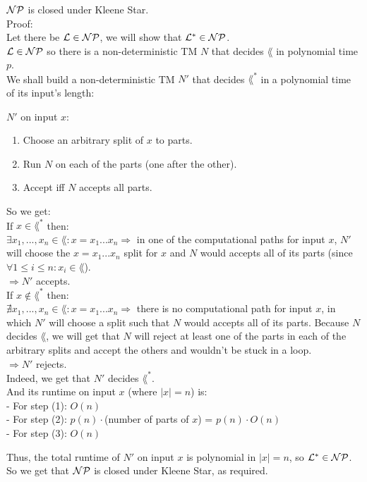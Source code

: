 $\mathcal{N}\mathcal{P}$ is closed under Kleene Star. \\

Proof: \\
Let there be $\mathcal{L} \in \mathcal{N}\mathcal{P}$, we will show that $\mathcal{L}^* \in \mathcal{N}\mathcal{P}$. \\
$\mathcal{L} \in \mathcal{N}\mathcal{P}$ so there is a non-deterministic TM $N$ that decides $\lang$ in polynomial time $p$. \\
We shall build a non-deterministic TM $N'$ that decides $\lang^*$ in a polynomial time of its input's length:

$N'$ on input $x$:
\begin{enumerate}[1., itemsep=5pt]

    \item Choose an arbitrary split of $x$ to parts.

    \item Run $N$ on each of the parts (one after the other).

    \item Accept iff $N$ accepts all parts.

\end{enumerate}

So we get: \\
If $x \in \lang^*$ then: \\
$\exists x_1,...,x_n \in \lang: x=x_1...x_n \Rightarrow $ in one of the computational
paths for input $x$, $N'$ will choose the $x=x_1...x_n$ split for $x$ and $N$ would accepts all of its parts
(since $\forall 1 \leq i \leq n: x_i \in \lang$). \\
$\Rightarrow N'$ accepts. \\

If $x \notin \lang^*$ then: \\
$\nexists x_1,...,x_n \in \lang: x=x_1...x_n \Rightarrow $ there is no computational
path for input $x$, in which $N'$ will choose a split such that $N$ would accepts all of its parts.
Because $N$ decides $\lang$, we will get that $N$ will reject at least one of the parts in
each of the arbitrary splits and accept the others and wouldn't be stuck in a loop. \\
$\Rightarrow N'$ rejects. \\

Indeed, we get that $N'$ decides $\lang^*$. \\
And its runtime on input $x$ (where $|x|=n$) is: \\
- For step (1): $O(n)$ \\
- For step (2): $p(n) \cdot$(number of parts of $x$) = $p(n) \cdot O(n)$ \\
- For step (3): $O(n)$

Thus, the total runtime of $N'$ on input $x$ is polynomial in $|x|=n$, so $\mathcal{L}^* \in \mathcal{N}\mathcal{P}$. \\
So we get that $\mathcal{N}\mathcal{P}$ is closed under Kleene Star, as required. \\


